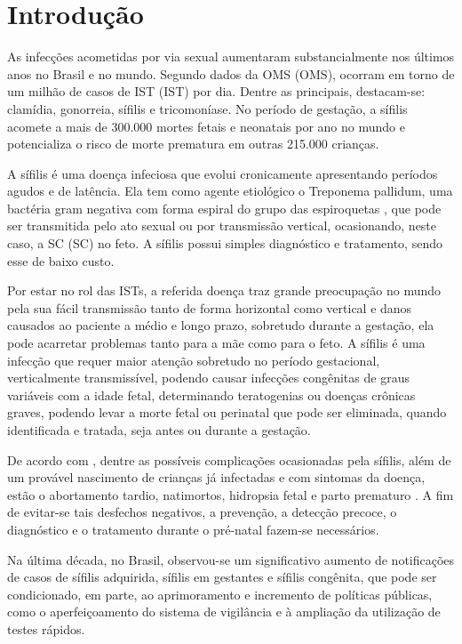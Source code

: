 \chapter{Introdução}
\label{cap:introducao}

As infecções acometidas por via sexual aumentaram substancialmente nos últimos anos no Brasil e no mundo. Segundo dados da \acrlong{OMS} (\acrshort{OMS}), ocorram em torno de um milhão de casos de \acrlong{IST} (\acrshort{IST}) por dia. Dentre as principais, destacam-se: clamídia, gonorreia, sífilis e tricomoníase. No período de gestação, a sífilis acomete a mais de 300.000 mortes fetais e neonatais por ano no mundo e potencializa o risco de morte prematura em outras 215.000 crianças. \cite{boletim2018}

A sífilis é uma doença infeciosa que evolui cronicamente apresentando períodos agudos e de latência. Ela tem como agente etiológico o Treponema pallidum, uma bactéria gram negativa com forma espiral do grupo das espiroquetas \cite{mendes2005microbiologia}, que pode ser transmitida pelo ato sexual ou por transmissão vertical, ocasionando, neste caso, a \acrlong{SC} (\acrshort{SC}) no feto. A sífilis possui simples diagnóstico e tratamento, sendo esse de baixo custo. \cite{brasilprenatal}

Por estar no rol das \acrshort{IST}s, a referida doença traz grande preocupação no mundo pela sua fácil transmissão tanto de forma horizontal como vertical e danos causados ao paciente a médio e longo prazo, sobretudo durante a gestação, ela pode acarretar problemas tanto para a mãe como para o feto. A sífilis é uma infecção que requer maior atenção sobretudo no período gestacional, verticalmente transmissível, podendo causar infecções congênitas de graus variáveis com a idade fetal, determinando teratogenias ou doenças crônicas graves, podendo levar a morte fetal ou perinatal que pode ser eliminada, quando identificada e tratada, seja antes ou durante a gestação. \cite{avelleira2006}

De acordo com \cite{brasilprenatal}, dentre as possíveis complicações ocasionadas pela sífilis, além de um provável nascimento de crianças já infectadas e com sintomas da doença, estão o abortamento tardio, natimortos, hidropsia fetal e parto prematuro \cite{brasilprenatal}. A fim de evitar-se tais desfechos negativos, a prevenção, a detecção precoce, o diagnóstico e o tratamento durante o pré-natal fazem-se necessários.

Na última década, no Brasil, observou-se um significativo aumento de notificações de casos de sífilis adquirida, sífilis em gestantes e sífilis congênita, que pode ser condicionado, em parte, ao aprimoramento e incremento de políticas públicas, como o aperfeiçoamento do sistema de vigilância e à ampliação da utilização de testes rápidos. \cite{boletim2018}

